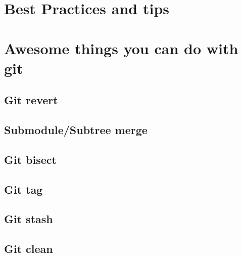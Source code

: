 \documentclass[10pt,a4paper]{beamer}
\begin{document}
\section{Best Practices and tips}
\begin{frame}

\end{frame}


\section{Awesome things you can do with git}

\subsection{Git revert}
\begin{frame}

\end{frame}

\subsection{Submodule/Subtree merge}
\begin{frame}

\end{frame}

\subsection{Git bisect}
\begin{frame}

\end{frame}

\subsection{Git tag}
\begin{frame}

\end{frame}

\subsection{Git stash}
\begin{frame}

\end{frame}

\subsection{Git clean}
\begin{frame}

\end{frame}
\end{document}
